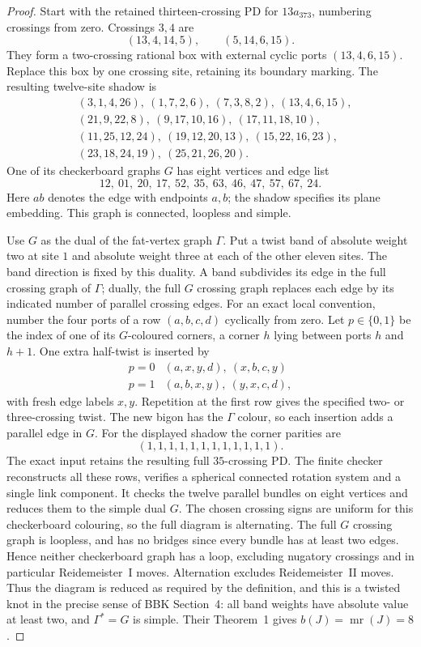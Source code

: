 \documentclass[11pt]{article}
\begin{document}
\begin{proof}
Start with the retained thirteen-crossing PD for $13a_{373}$, numbering
crossings from zero. Crossings $3,4$ are
\[
                 (13,4,14,5),\qquad(5,14,6,15).
\]
They form a two-crossing rational box with external cyclic ports
$(13,4,6,15)$. Replace this box by one crossing site, retaining its
boundary marking. The resulting twelve-site shadow is
\[
\begin{split}
 &(3,1,4,26),\ (1,7,2,6),\ (7,3,8,2),\ (13,4,6,15),\\
 &(21,9,22,8),\ (9,17,10,16),\ (17,11,18,10),\\
 &(11,25,12,24),\ (19,12,20,13),\ (15,22,16,23),\\
 &(23,18,24,19),\ (25,21,26,20).
\end{split}
\]
One of its checkerboard graphs $G$ has eight vertices and edge list
\[
 12,\ 01,\ 20,\ 17,\ 52,\ 35,\ 63,\ 46,\ 47,\ 57,\ 67,\ 24.
\]
Here $ab$ denotes the edge with endpoints $a,b$; the shadow specifies
its plane embedding. This graph is connected, loopless and simple.

Use $G$ as the dual of the fat-vertex graph $\Gamma$.
Put a twist band of absolute weight two at site $1$ and absolute
weight three at each of the other eleven sites. The band direction is
fixed by this duality. A band subdivides its edge in the full
crossing graph of $\Gamma$; dually, the full $G$ crossing graph
replaces each edge by its indicated number of parallel crossing edges.
For an exact local convention, number the four ports of a row
$(a,b,c,d)$ cyclically from zero. Let $p\in\{0,1\}$ be the index of
one of its $G$-coloured corners, a corner $h$ lying between ports
$h$ and $h+1$. One extra half-twist is inserted by
\[
\begin{array}{c|c}
p=0&(a,x,y,d),\ (x,b,c,y)\\
p=1&(a,b,x,y),\ (y,x,c,d),
\end{array}
\]
with fresh edge labels $x,y$. Repetition at the first row gives the
specified two- or three-crossing twist. The new bigon has the
$\Gamma$ colour, so each insertion adds a parallel edge in $G$.
For the displayed shadow the corner parities are
\[
                  (1,1,1,1,1,1,1,1,1,1,1,1).
\]
The exact input retains the resulting full $35$-crossing PD.
The finite checker reconstructs all these rows, verifies a spherical
connected rotation system and a single link component. It checks
the twelve parallel bundles on eight vertices and reduces them to the
simple dual $G$. The chosen crossing signs are uniform for this
checkerboard colouring, so the full diagram is alternating.
The full $G$ crossing graph is loopless, and has no bridges since
every bundle has at least two edges. Hence neither checkerboard
graph has a loop, excluding nugatory crossings and in particular
Reidemeister~I moves. Alternation excludes Reidemeister~II moves.
Thus the diagram is reduced as required by the definition, and
this is a twisted knot in the precise sense of
BBK Section~4: all band weights have absolute value at least two,
and $\Gamma^*=G$ is simple. Their Theorem~1 gives
$b(J)=\operatorname{mr}(J)=8$.


\end{proof}
\end{document}
